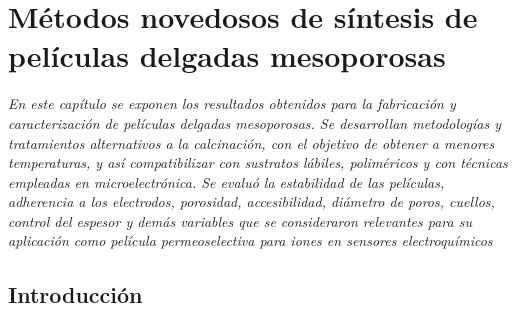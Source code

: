  \newcommand{\NoBiblioMeso}[1]{
 \ifthenelse{\equal{#1}{verdadero}}{}{}
 \NoBiblioMeso{verdadero}}

 
 \FormatoCapituloDosLineas
 
 \chapter{Métodos novedosos de síntesis de películas delgadas mesoporosas}
 \label{chap:Mesoporosos}

 \thispagestyle{empty}
	
 \noindent\textit{En este capítulo se exponen los resultados obtenidos para la fabricación y caracterización de películas delgadas mesoporosas. Se desarrollan metodologías y tratamientos alternativos a la calcinación, con el objetivo de obtener \pdm\space a menores temperaturas, y así compatibilizar con sustratos lábiles, poliméricos y con técnicas empleadas en microelectrónica. Se evaluó la estabilidad de las películas, adherencia a los electrodos, porosidad, accesibilidad, diámetro de poros, cuellos, control del espesor y demás variables que se consideraron relevantes para su aplicación como película permeoselectiva para iones en sensores electroquímicos}
 
 \vfill
 \minitoc
 \newpage

\section{Introducción}

